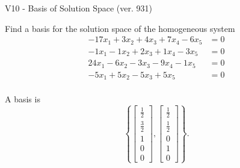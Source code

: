 \begin{exercise}
  \begin{exerciseTitle}V10 - Basis of Solution Space (ver. 931)\end{exerciseTitle}
  \begin{exerciseStatement}
    Find a basis for the solution space of the homogeneous system 
\begin{align*}
 -17 x_ 1 + 3 x_ 2 + 4 x_ 3 + 7 x_ 4 -6 x_ 5 &= 0  \\ 
  -1 x_ 1 -1 x_ 2 + 2 x_ 3 + 1 x_ 4 -3 x_ 5 &= 0  \\ 
  24 x_ 1 -6 x_ 2 -3 x_ 3 -9 x_ 4 -1 x_ 5 &= 0  \\ 
  -5 x_ 1 + 5 x_ 2 -5 x_ 3 + 5 x_ 5 &= 0  \\ 
 \end{align*}


 
  \end{exerciseStatement}

  \begin{exerciseAnswer}
   A basis is   
\[\left\{\left[\begin{array}{c}
\frac{1}{2} \\
\frac{3}{2} \\
1 \\
0 \\
0
\end{array}\right] , \left[\begin{array}{c}
\frac{1}{2} \\
\frac{1}{2} \\
0 \\
1 \\
0
\end{array}\right]\right\}.\]

  


  \end{exerciseAnswer}
\end{exercise}